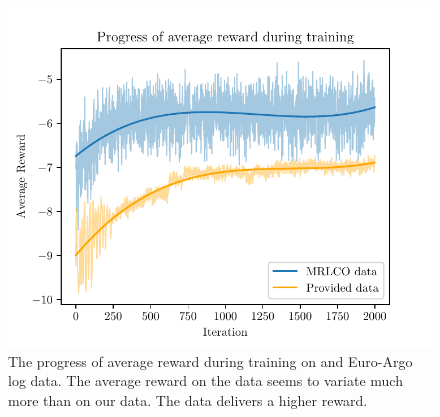 \begin{figure}[htp!]
    \centering
    \includegraphics[width=.7\textwidth]{./fig/reward.pdf}
    \caption{The progress of average reward during training on \mrlco and
    Euro-Argo log data. The average reward on the \mrlco data seems to variate much
    more than on our data. The \mrlco data delivers a higher reward.}
    \label{fig:rewards}
\end{figure}
